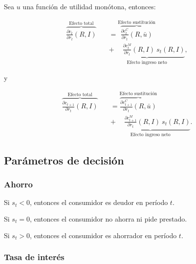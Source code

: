 \documentclass[8pt,a4paper]{extarticle}
\begin{document}
\begin{multicols}{3}
\begin{boxtheo}
	Sea $u$ una función de utilidad monótona, entonces:
	
	\begin{equation*}
	\begin{aligned}
		\overbrace{\frac{\partial c_t}{\partial r_t} (R, I)}^{\text{Efecto total}} \quad &= \overbrace{\frac{\partial c_t^C}{\partial r_t} (R, \bar{u})}^{\text{Efecto sustitución}} \\
																						   & \underbrace{ + \quad\ \frac{\partial c_t^M}{\partial r_t} (R, I)\ s_t (R, I)}_{\text{Efecto ingreso neto}},
	\end{aligned}
	\end{equation*}	

	y

	\begin{equation*}
	\begin{aligned}
		\overbrace{\frac{\partial c_{t+1}}{\partial r_t} (R, I)}^{\text{Efecto total}} \quad &= \overbrace{\frac{\partial c_{t+1}^C}{\partial r_t} (R, \bar{u})}^{\text{Efecto sustitución}} \\
																					   & \underbrace{ + \quad\ \frac{\partial c_{t+1}^M}{\partial r_t} (R, I)\ s_t (R, I)}_{\text{Efecto ingreso neto}}.
	\end{aligned}
	\end{equation*}	
	
\end{boxtheo}

\sectionbreak

\subsection{Parámetros de decisión}

\subsubsection*{Ahorro}

\begin{eqlist}
\item Si $s_t < 0$, entonces el consumidor es deudor en período $t$.
\item Si $s_t = 0$, entonces el consumidor no ahorra ni pide prestado.
\item Si $s_t > 0$, entonces el consumidor es ahorrador en período $t$.
\end{eqlist}

\subsubsection*{Tasa de interés}


\end{multicols}
\end{document}
